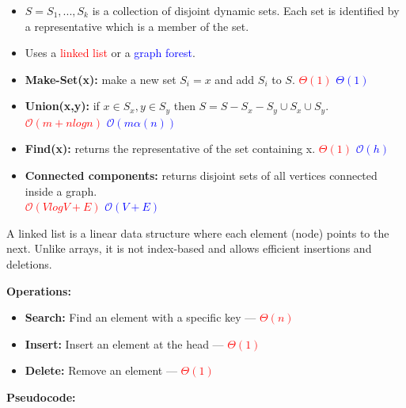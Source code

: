 \documentclass[a4paper,landscape]{article}
\newcommand{\timecomplexity}[1]{\textcolor{red}{#1}}
\newcommand{\bigo}{\mathcal{O}}
\begin{document}
\begin{multicols}{7}
\tcolorbox[mybox={Disjoint sets}]
\begin{itemize}[noitemsep,itemsep=0pt]
    \item \(S = {S_1, ..., S_k}\) is a collection of disjoint dynamic sets. Each set is identified by a representative which is a member of the set.
    \item Uses a \timecomplexity{linked list} or a \textcolor{blue}{graph forest}.
    \item \textbf{Make-Set(x):} make a new set \(S_i = {x}\) and add $S_i$ to $S$. \timecomplexity{\(\Theta(1)\)} \textcolor{blue}{\(\Theta(1)\)}
    \item \textbf{Union(x,y):} if \(x \in S_x, y \in S_y\) then \(S = S - S_x - S_y \cup {S_x \cup S_y}\). \timecomplexity{\(\bigo(m+nlogn)\)} \textcolor{blue}{\(\bigo(m \alpha(n))\)}
    \item \textbf{Find(x):} returns the representative of the set containing x. \timecomplexity{\(\Theta(1)\)} \textcolor{blue}{\(\bigo(h)\)}
    \item \textbf{Connected components:} returns disjoint sets of all vertices connected inside a graph. \\ \timecomplexity{\(\bigo(VlogV + E)\)} \textcolor{blue}{\(\bigo(V+E)\)}
\end{itemize}
\endtcolorbox

\tcolorbox[mybox={Linked List}]
A linked list is a linear data structure where each element (node) points to the next. Unlike arrays, it is not index-based and allows efficient insertions and deletions.

\textbf{Operations:}
\begin{itemize}[noitemsep,itemsep=0pt]
    \item \textbf{Search:} Find an element with a specific key — \timecomplexity{\(\Theta(n)\)}
    \item \textbf{Insert:} Insert an element at the head — \timecomplexity{\(\Theta(1)\)}
    \item \textbf{Delete:} Remove an element — \timecomplexity{\(\Theta(1)\)}
\end{itemize}

\textbf{Pseudocode:}

\noindent %
\end{multicols}
\end{document}
